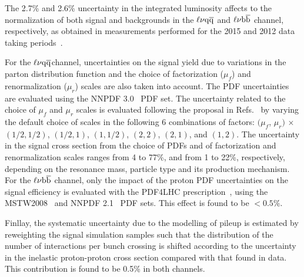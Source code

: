 The 2.7\% and 2.6\% uncertainty in the integrated luminosity affects to the normalization of both signal and backgrounds in the $\ell\nu\mathrm{q}\overline{\mathrm{q}}$ and $\ell\nu{\mathrm{b}\overline{\mathrm{b}}}$ channel, respectively, as obtained in measurements performed for the 2015 and 2012 data taking periods~\cite{CMS-PAS-LUM-15-001,CMS:LUM13001}. 

For the $\ell\nu\mathrm{q}\overline{\mathrm{q}}$channel, uncertainties on the signal yield due to variations in the parton distribution function and the choice of factorization ($\mu_{f}$) and renormalization ($\mu_{r}$) scales are also taken into account.
The PDF uncertainties are evaluated using the NNPDF 3.0~\cite{Ball:2011mu} PDF set.
The uncertainty related to the choice of $\mu_{f}$ and $\mu_{r}$ scales is evaluated following the proposal in Refs.~\cite{Cacciari:2003fi,Catani:2003zt} by varying the default choice of scales in the following 6 combinations of factors:
$(\mu_{f}$, $\mu_{r})$ $\times$ $(1/2, 1/2)$, $(1/2, 1)$, $(1,1/2)$, $(2, 2)$, $(2, 1)$, and $(1, 2)$.
The uncertainty in the signal cross section from the choice of PDFs and of factorization and renormalization scales ranges from 4 to 77\%, and from 1 to 22\%, respectively, depending on the resonance mass, particle type and its production mechanism.
For the $\ell\nu{\mathrm{b}\overline{\mathrm{b}}}$ channel, only the impact of the proton PDF uncertainties on the signal efficiency is evaluated with the PDF4LHC prescription~\cite{Botje:2011sn,Alekhin:2011sk}, using the MSTW2008~\cite{MSTW} and NNPDF 2.1~\cite{NNPDF} PDF sets. This effect is found to be $< 0.5\%$.

Finllay, the systematic uncertainty due to the modelling of pileup is estimated by reweighting the signal simulation samples such that the distribution of the number of interactions per bunch crossing is shifted according to the uncertainty in the inelastic proton-proton cross section compared with that found in data. This contribution is found to be 0.5\% in both channels.

